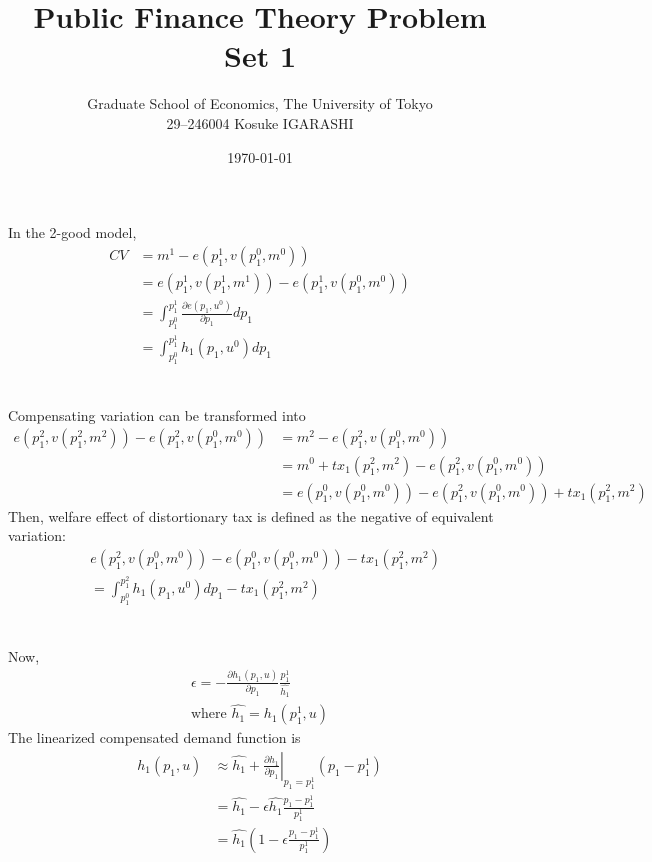 \documentclass[a4paper]{article}
\title{Public Finance Theory Problem Set 1}
\date{\today}
\author{Graduate School of Economics, The University of Tokyo\\[4mm]29--246004 Kosuke IGARASHI}
\begin{document}
\maketitle


\section{} %
In the 2-good model, 
\begin{align*}
    CV &= m^1 - e(p_1^1, v(p_1^0, m^0))\\
    &= e(p_1^1, v(p_1^1, m^1)) - e(p_1^1, v(p_1^0, m^0))\\
    &= \int_{p_1^0}^{p_1^1} \frac{\partial e(p_1, u^0)}{\partial p_1} dp_1\\
    &= \int_{p_1^0}^{p_1^1} h_1(p_1, u^0) dp_1
\end{align*}

\section{} %
Compensating variation can be transformed into
\begin{align*}
    e(p_1^2, v(p_1^2, m^2)) - e(p_1^2, v(p_1^0, m^0)) &= m^2 - e(p_1^2, v(p_1^0, m^0))\\
    &= m^0 + tx_1(p_1^2, m^2) - e(p_1^2, v(p_1^0, m^0))\\
    &= e(p_1^0, v(p_1^0, m^0)) - e(p_1^2, v(p_1^0, m^0)) + tx_1(p_1^2, m^2)
\end{align*}
Then, welfare effect of distortionary tax is defined as the negative of equivalent variation:
\begin{align*}
    &e(p_1^2, v(p_1^0, m^0)) - e(p_1^0, v(p_1^0, m^0)) - tx_1(p_1^2, m^2)\\
    &= \int_{p_1^0}^{p_1^2} h_1(p_1, u^0) dp_1 - tx_1(p_1^2, m^2)
\end{align*}

\section{} %
Now,
\begin{align*}
    \epsilon = - \frac{\partial h_1(p_1, u)}{\partial p_1} \frac{p_1^1}{\hat{h_1}}\\
    \text{where } \hat{h_1} = h_1(p_1^1, u)
\end{align*}
The linearized compensated demand function is
\begin{align*}
    h_1(p_1, u) &\approx \hat{h_1} + \left. \frac{\partial h_1}{\partial p_1} \right|_{p_1 = p_1^1} (p_1 - p_1^1)\\
    &= \hat{h_1} - \epsilon \hat{h_1} \frac{p_1 - p_1^1}{p_1^1}\\
    &= \hat{h_1}\left(1 - \epsilon \frac{p_1 - p_1^1}{p_1^1}\right)
\end{align*}
\end{document}
